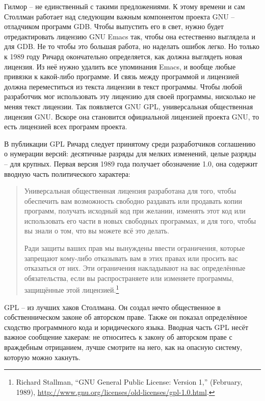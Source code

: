 Гилмор -- не единственный с такими предложениями. К этому времени и сам Столлман работает над следующим важным компонентом проекта GNU -- отладчиком программ GDB. Чтобы выпустить его в свет, нужно будет отредактировать лицензию GNU Emacs так, чтобы она естественно выглядела и для GDB. Не то чтобы это большая работа, но наделать ошибок легко. Но только к 1989 году Ричард окончательно определяется, как должна выглядеть новая лицензия. Из неё нужно удалить все упоминания Emacs, и вообще любые привязки к какой-либо программе. И связь между программой и лицензией должна переместиться из текста лицензии в текст программы. Чтобы любой разработчик мог использовать эту лицензию для своей программы, нисколько не меняя текст лицензии. Так появляется GNU GPL, универсальная общественная лицензия GNU. Вскоре она становится официальной лицензией проекта GNU, то есть лицензией всех программ проекта.

В публикации GPL Ричард следует принятому среди разработчиков соглашению о нумерации версий: десятичные разряды для мелких изменений, целые разряды -- для крупных. Первая версия 1989 года получает обозначение 1.0, она содержит вводную часть политического характера:

\begin{quote}
Универсальная общественная лицензия разработана для того, чтобы обеспечить вам возможность свободно раздавать или продавать копии программ, получать исходный код при желании, изменять этот код или использовать его части в новых свободных программах, и для того, чтобы вы знали о том, что вы можете всё это делать.

Ради защиты ваших прав мы вынуждены ввести ограничения, которые запрещают кому-либо отказывать вам в этих правах или просить вас отказаться от них. Эти ограничения накладывают на вас определённые обязательства, если вы распространяете или изменяете программы, защищённые этой лицензией.\footnote{Richard Stallman, \enquote{GNU General Public License: Version 1,} (February, 1989), \url{http://www.gnu.org/licenses/old-licenses/gpl-1.0.html}.}
\end{quote}

GPL -- из лучших хаков Столлмана. Он создал нечто общественное в собственническом законе об авторском праве. Также он показал определённое сходство программного кода и юридического языка. Вводная часть GPL несёт важное сообщение хакерам: не относитесь к закону об авторском праве с враждебным отрицанием, лучше смотрите на него, как на опасную систему, которую можно хакнуть.


